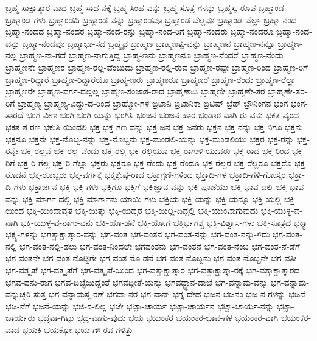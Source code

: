 {ಬ್ರಹ್ಮ-ಸಾಕ್ಷಾತ್ಕಾರ-ವಾದ
ಬ್ರಹ್ಮ-ಸಾಧ-ನಕ್ಕೆ
ಬ್ರಹ್ಮ-ಸಿಂಹ-ವನ್ನು
ಬ್ರಹ್ಮ-ಸೂತ್ರ-ಗಳನ್ನು
ಬ್ರಹ್ಮಸ್ವ-ರೂಪ
ಬ್ರಹ್ಮಾಂಡ
ಬ್ರಹ್ಮಾಂಡ-ಗಳು
ಬ್ರಹ್ಮಾಂಡದಿ
ಬ್ರಹ್ಮಾಂಡ-ವನ್ನು
ಬ್ರಹ್ಮಾಂಡವೂ
ಬ್ರಹ್ಮಾಂಡ-ವೆಲ್ಲವೂ
ಬ್ರಹ್ಮಾಂಡ-ವೆಲ್ಲಾ
ಬ್ರಹ್ಮಾ-ನಂದ
ಬ್ರಹ್ಮಾ-ನಂದದ
ಬ್ರಹ್ಮಾ-ನಂದರ
ಬ್ರಹ್ಮಾ-ನಂದ-ರನ್ನು
ಬ್ರಹ್ಮಾ-ನಂದ-ರಿಗೆ
ಬ್ರಹ್ಮಾ-ನಂದರು
ಬ್ರಹ್ಮಾ-ನಂದರೂ
ಬ್ರಹ್ಮಾ-ನಂದ-ವನ್ನು
ಬ್ರಹ್ಮಾ-ನಂದವೂ
ಬ್ರಹ್ಮಾಭಾ-ಸದ
ಬ್ರಹ್ಮೈವ
ಬ್ರಾಹ್ಮಣ
ಬ್ರಾಹ್ಮಣತ್ವ-ವನ್ನು
ಬ್ರಾಹ್ಮಣನ
ಬ್ರಾಹ್ಮಣ-ನನ್ನೂ
ಬ್ರಾಹ್ಮಣ-ನಲ್ಲ
ಬ್ರಾಹ್ಮಣ-ನಾ-ಗದೆ
ಬ್ರಾಹ್ಮಣ-ನಾಗುತ್ತಿದ್ದ
ಬ್ರಾಹ್ಮ-ಣನು
ಬ್ರಾಹ್ಮಣನೂ
ಬ್ರಾಹ್ಮಣ-ನೆಂದರೆ
ಬ್ರಾಹ್ಮಣ-ನೆಂದು
ಬ್ರಾಹ್ಮಣನೇ
ಬ್ರಾಹ್ಮಣರ
ಬ್ರಾಹ್ಮಣ-ರಲ್ಲ-ವೆಂಬುದು
ಬ್ರಾಹ್ಮಣ-ರಲ್ಲಿ-ರುವ
ಬ್ರಾಹ್ಮಣ-ರಷ್ಟೇ
ಬ್ರಾಹ್ಮಣ-ರಿಂದ
ಬ್ರಾಹ್ಮಣ-ರಿಗೆ
ಬ್ರಾಹ್ಮಣ-ರಿದ್ದಾರೆ
ಬ್ರಾಹ್ಮಣ-ರಿದ್ದಾರೆಯೊ
ಬ್ರಾಹ್ಮ-ಣರು
ಬ್ರಾಹ್ಮಣರೂ
ಬ್ರಾಹ್ಮಣರೆ
ಬ್ರಾಹ್ಮಣ-ರೆಂದು
ಬ್ರಾಹ್ಮಣ-ರೆಲ್ಲಾ
ಬ್ರಾಹ್ಮಣರೇ
ಬ್ರಾಹ್ಮಣ-ವರ್ಗ-ದಲ್ಲಲ್ಲ
ಬ್ರಾಹ್ಮಣ-ಸಂಜಾತ-ರಾದ
ಬ್ರಾಹ್ಮಣಾದಿ
ಬ್ರಾಹ್ಮಣೀ
ಬ್ರಾಹ್ಮಣೇ-ತರ
ಬ್ರಾಹ್ಮಣೇ-ತರ-ರಿಗೆ
ಬ್ರಾಹ್ಮಣ್ಯ
ಬ್ರಾಹ್ಮಣ್ಯ-ವಿದ್ದು-ದ-ರಿಂದ
ಬ್ರಾಹ್ಮೋ-ಗಳ
ಬ್ರಿಟಾನಿ
ಬ್ರಿಟಾನಿಕಾ
ಬ್ರಿಟಿಷ್
ಬ್ರೆಡ್
ಬ್ರೌನಿಂಗನ
ಭಂಗ
ಭಂಗ-ತಾರದೆ
ಭಂಗ-ವೀಣ
ಭಂಗಿ
ಭಂಗಿ-ಯನ್ನು
ಭಂಗಿಸಿ
ಭಂಜನ
ಭಂಜನ-ಹಾರ
ಭಂಡಾರ-ವಾಗಿ-ರು-ವನು
ಭಕತ-ವೃಂದ
ಭಕತ-ಶ-ರಣ
ಭಕುತಿ-ಯಿಂದಲಿ
ಭಕ್ತ
ಭಕ್ತ-ಗಣ-ವನ್ನು
ಭಕ್ತ-ಜನ
ಭಕ್ತ-ಜನರು
ಭಕ್ತನ
ಭಕ್ತ-ನನ್ನು
ಭಕ್ತ-ನಿಗೂ
ಭಕ್ತನು
ಭಕ್ತನೂ
ಭಕ್ತನೇ
ಭಕ್ತ-ನೊಬ್ಬ-ನನ್ನು
ಭಕ್ತ-ನೊಬ್ಬನು
ಭಕ್ತ-ಮಂಡಲಿ-ಯನ್ನು
ಭಕ್ತ-ಮಂಡಲಿಯು
ಭಕ್ತರ
ಭಕ್ತ-ರನ್ನು
ಭಕ್ತ-ರನ್ನೇ
ಭಕ್ತ-ರಲ್ಲವೆ
ಭಕ್ತ-ರಲ್ಲ-ವೆಂದು
ಭಕ್ತ-ರಲ್ಲಿ
ಭಕ್ತ-ರಲ್ಲಿಯೂ
ಭಕ್ತ-ರಾಗುಳಿ-ಯುವರು
ಭಕ್ತ-ರಾದ
ಭಕ್ತ-ರಿಂದ
ಭಕ್ತ-ರಿಗೆ
ಭಕ್ತ-ರಿ-ಗೆಲ್ಲ
ಭಕ್ತ-ರಿ-ಗೆಲ್ಲಾ
ಭಕ್ತರು
ಭಕ್ತರೂ
ಭಕ್ತ-ರೆಂದು
ಭಕ್ತ-ರೆಂದೂ
ಭಕ್ತ-ರೆಲ್ಲರ
ಭಕ್ತ-ರೆಲ್ಲರೂ
ಭಕ್ತರೊ
ಭಕ್ತ-ರೊಡನೆ
ಭಕ್ತ-ರೊಬ್ಬರು
ಭಕ್ತ-ವರ್ಗಕ್ಕೆ
ಭಕ್ತಶ್ರೇಷ್ಠ-ರಾದ
ಭಕ್ತಾಗ್ರಣಿ-ಗಳಿಂದ
ಭಕ್ತಾದಿ-ಗಳ
ಭಕ್ತಾದಿ-ಗಳಿ-ಗೋಸ್ಕರ
ಭಕ್ತಾ-ದಿ-ಗಳು
ಭಕ್ತಾರ್ಜನ
ಭಕ್ತಿ
ಭಕ್ತಿ-ಗಳು
ಭಕ್ತಿಗೂ
ಭಕ್ತಿಗೆ
ಭಕ್ತಿಜ್ಞಾನ-ವನ್ನು
ಭಕ್ತಿ-ಪೂಜೆಯು
ಭಕ್ತಿ-ಭಾವ-ದಲ್ಲಿ
ಭಕ್ತಿ-ಭಾವ-ವನ್ನು
ಭಕ್ತಿ-ಮಾರ್ಗ-ದಲ್ಲಿ
ಭಕ್ತಿ-ಮಾರ್ಗಾನು-ಯಾಯಿ-ಗಳು
ಭಕ್ತಿಯ
ಭಕ್ತಿ-ಯನ್ನು
ಭಕ್ತಿ-ಯನ್ನೂ
ಭಕ್ತಿ-ಯಲ್ಲಿ
ಭಕ್ತಿ-ಯಿಂದ
ಭಕ್ತಿ-ಯಿಂದಾವೃತ
ಭಕ್ತಿ-ಯಿತ್ತು
ಭಕ್ತಿ-ಯಿದ್ದರೆ
ಭಕ್ತಿ-ಯಿಲ್ಲ-ದಿದ್ದಲ್ಲಿ
ಭಕ್ತಿ-ಯುಂಟಾಗುವುದು
ಭಕ್ತಿ-ಯುಳ್ಳ-ವ-ನಾಗಿ
ಭಕ್ತಿ-ಯುಳ್ಳ-ವ-ನಾಗು-ವನು
ಭಕ್ತಿ-ಯೊ-ಡನೆ
ಭಕ್ತಿ-ಯೋಗ
ಭಕ್ತಿರ್ಭಗಶ್ಚ
ಭಕ್ತಿ-ವಿಶ್ವಾಸ-ಗಳು
ಭಕ್ತಿ-ಸೂತ್ರದ
ಭಕ್ತ್ಯಾ
ಭಕ್ಷ್ಯ-ಗಳನ್ನು
ಭಗತ್ಸಾಕ್ಷಾತ್ಕಾರ-ವನ್ನು
ಭಗ-ವಂತ
ಭಗ-ವಂತನ
ಭಗ-ವಂತ-ನನ್ನು
ಭಗ-ವಂತ-ನನ್ನು-ಳಿದು
ಭಗ-ವಂತ-ನಲ್ಲಿ
ಭಗ-ವಂತ-ನಲ್ಲಿ-ಡಲು
ಭಗ-ವಂತ-ನಿಂದಲೇ
ಭಗವಂತನು
ಭಗ-ವಂತನೆ
ಭಗ-ವಂತ-ನೆಂಬ
ಭಗ-ವಂತ-ನೆ-ಡೆಗೆ
ಭಗ-ವಂತನೇ
ಭಗ-ವಂತ-ನೊಟ್ಟಿಗೇ
ಭಗ-ವಂತ-ನೊ-ಡನೆ
ಭಗ-ವಂತ-ನೊಬ್ಬನು
ಭಗ-ವಂತ-ನೊಬ್ಬನೇ
ಭಗ-ವತೀ
ಭಗ-ವತ್ಕೃಪೆ
ಭಗ-ವತ್ಕೃಪೆಗೆ
ಭಗ-ವತ್ಕೃಪೆ-ಯಿಂದ
ಭಗ-ವತ್ಸಾಕ್ಷಾತ್ಕಾರ
ಭಗ-ವತ್ಸಾಕ್ಷಾತ್ಕಾ-ರಕ್ಕೆ
ಭಗ-ವತ್ಸಾಕ್ಷಾತ್ಕಾರದ
ಭಗವ-ದನು-ರಾಗ
ಭಗವ-ದಿಚ್ಛೆಯಿದ್ದಂತೆ
ಭಗವದ್ಗೀತೆ-ಯನ್ನು
ಭಗವದ್ಜ್ಞಾನ-ದಾಚೆ
ಭಗ-ವನ್ನಾಮ-ವನ್ನು
ಭಗ-ವನ್ನಾಮ-ವನ್ನುಚ್ಚರಿ-ಸುತ್ತ
ಭಗ-ವನ್ನಾಮಸ್ಮ-ರಣೆ
ಭಗವಾ-ನರ
ಭಗ-ವಾನ್
ಭಗ್ನ-ದೇಹ
ಭಜನ
ಭಜನಂ
ಭಜ-ನ-ಗಳನ್ನು
ಭಜನೆ
ಭಜ-ನೆಗೆ
ಭಜನೆ-ಯನ್ನು
ಭಜಿ-ಸ-ಲಿಲ್ಲ
ಭಜೇ
ಭಟ್ಟಾ-ಚಾರ್ಯ
ಭಟ್ಟಾ-ಚಾರ್ಯನ
ಭಟ್ಟಾ-ಚಾರ್ಯ-ನನ್ನು
ಭಟ್ಟಾ-ಚಾರ್ಯರು
ಭದ್ರವಾ-ಗಿಟ್ಟು
ಭದ್ರ-ವಾಗು-ವುದು
ಭಯ
ಭಯಂಕರ
ಭಯಂಕರ-ಭಾವ-ಗಳ
ಭಯಂಕರ-ವಾಗಿ
ಭಯಂಕರ-ವಾದ
ಭಯಕಿ
ಭಯಕ್ಕೋ
ಭಯ-ಗೌ-ರವ-ಗಳಿತ್ತು
}
